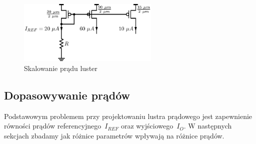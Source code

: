 \documentclass[twoside,pl,final]{labman}
\begin{document}
\begin{figure}[!htbp]
  \centering
  \includegraphics[width=0.6\textwidth]{scale}
  \caption{Skalowanie prądu luster}
  \label{fig:basic:scale}
\end{figure}

\subsection{Dopasowywanie prądów}
\label{matching}
Podstawowym problemem przy projektowaniu lustra prądowego
jest zapewnienie równości prądów referencyjnego~$I_{REF}$
oraz wyjściowego~$I_O$.
W następnych sekcjach zbadamy jak różnice parametrów
wpływają na różnice prądów.
\end{document}
